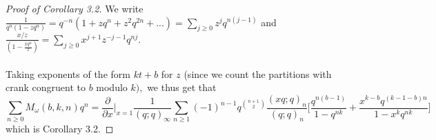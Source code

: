 \documentclass[10pt,reqno]{amsart}
\begin{document}
\begin{proof}[Proof of Corollary 3.2] 
We write $\displaystyle\frac{1}{q^n(1-zq^n)}=q^{-n}(1+zq^n+z^2q^{2n}+...)=\displaystyle\sum_{j\geq 0}z^jq^{n(j-1)}$ and $\displaystyle\frac{x/z}{(1-\displaystyle\frac{xq^n}{z})}=\displaystyle\sum_{j\geq 0}x^{j+1}z^{-j-1}q^{nj}.$ \\ \\
Taking exponents of the form $kt+b$ for $z$ (since we count the partitions with crank congruent to $b$ modulo $k),$ we thus get that 
\begin{equation*}
    \displaystyle\sum_{n\geq 0}M_{\omega}(b,k,n)q^n=\frac{\partial}{\partial x}\Bigr\rvert_{x = 1}\displaystyle\frac{1}{(q;q)_{\infty}}\displaystyle\sum_{n\geq 1}(-1)^{n-1}q^{\binom{n+1}{2}}\displaystyle\frac{(xq;q)_n}{(q;q)_n}\big[\displaystyle\frac{q^{n(b-1)}}{1-q^{nk}}+\displaystyle\frac{x^{k-b}q^{(k-1-b)n}}{1-x^kq^{nk}}\big]
\end{equation*}
which is Corollary 3.2.
\end{proof}
\vspace{1cm}
\end{document}
